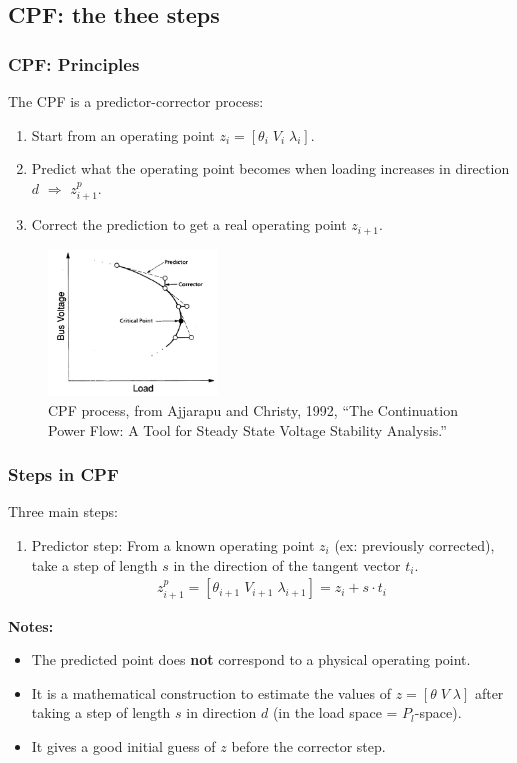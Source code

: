 \documentclass{beamer}
\begin{document}
\subsection{CPF: the thee steps}

\begin{frame}
  \frametitle{CPF: Principles}
The CPF is a predictor-corrector process:
\begin{enumerate}
\item Start from an operating point $z_i = [\theta_i \; V_i \; \lambda_i]$.
\item Predict what the operating point becomes when loading increases in direction $d$ $\Rightarrow$ $z_{i+1}^p$.
\item Correct the prediction to get a real operating point $z_{i+1}$.
\end{enumerate}
\begin{figure}[!h]
  \centering
  \includegraphics[width=0.4\textwidth]{CPFprocess.pdf}
  \caption{CPF process, from Ajjarapu and Christy, 1992, “The Continuation Power Flow: A Tool for Steady State Voltage Stability Analysis.”}
  \label{fig:CPFprocess}
\end{figure}
\end{frame}

\begin{frame}
  \frametitle{Steps in CPF}
Three main steps:
\begin{enumerate}
\item Predictor step: From a known operating point $z_i$ (ex: previously corrected), take a step of length $s$ in the direction of the tangent vector $t_{i}$.
  \begin{align}
  z_{i+1}^p = [\theta_{i+1} \; V_{i+1} \; \lambda_{i+1} ]= z_{i} + s \cdot t_{i}  
  \end{align}
\end{enumerate}
\textbf{Notes:}
\begin{itemize}
\item  The predicted point does \textbf{not} correspond to a physical operating point. 
\item It is a mathematical construction to estimate the values of $z=[\theta \; V \; \lambda]$ after taking a step of length $s$ in direction $d$ (in the load space = $P_l$-space).
\item It gives a good initial guess of $z$ before the corrector step.
\end{itemize}
\end{frame}
\end{document}
